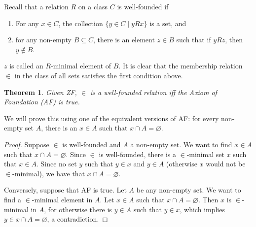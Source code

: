 \documentclass[12pt]{article}
\newtheorem{thm}{Theorem}
\begin{document}
Recall that a relation $R$ on a class $C$ is well-founded if 
\begin{enumerate}
\item
For any $x\in C$, the collection $\lbrace y\in C\mid yRx\rbrace$ is a set, and
\item
for any non-empty $B\subseteq C$, there is an element $z\in B$ such that if $yRz$, then $y\notin B$.  
\end{enumerate}
$z$ is called an $R$-minimal element of $B$.  It is clear that the membership relation $\in$ in the class of all sets satisfies the first condition above.

\begin{thm} Given ZF, $\in$ is a well-founded relation iff the Axiom of Foundation (AF) is true. \end{thm}

We will prove this using one of the equivalent versions of AF: for every non-empty set $A$, there is an $x\in A$ such that $x\cap A=\varnothing$.

\begin{proof}
Suppose $\in$ is well-founded and $A$ a non-empty set.  We want to find $x\in A$ such that $x\cap A=\varnothing$.  Since $\in$ is well-founded, there is a $\in$-minimal set $x$ such that $x\in A$.  Since no set $y$ such that $y\in x$ and $y\in A$ (otherwise $x$ would not be $\in$-minimal), we have that $x\cap A=\varnothing$.

Conversely, suppose that AF is true.  Let $A$ be any non-empty set.  We want to find a $\in$-minimal element in $A$.  Let $x\in A$ such that $x\cap A=\varnothing$.  Then $x$ is $\in$-minimal in $A$, for otherwise there is $y\in A$ such that $y\in x$, which implies $y\in x\cap A=\varnothing$, a contradiction.
\end{proof}
\end{document}
